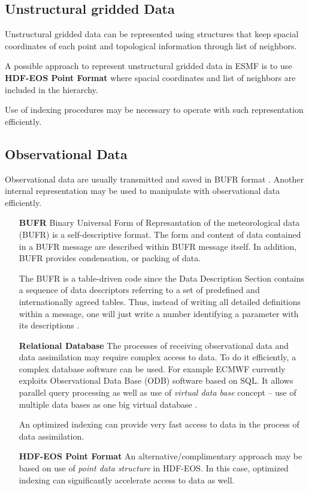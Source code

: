 \subsection{Unstructural gridded Data}

Unstructural gridded data can be represented using structures that
keep spacial coordinates of each point and topological information
through list of neighbors. 

A possible approach to represent unstructural gridded data in ESMF is
to use {\bf HDF-EOS Point Format} \cite{HDF-EOS} where spacial coordinates
and list of neighbors are included in the hierarchy.

Use of indexing procedures may be necessary to operate with such
representation efficiently. 

\subsection{Observational Data}

Observational data are usually transmitted and saved in BUFR format 
\cite{WMO-BUFR-CREX}. Another internal representation may be used to
manipulate with observational data efficiently.

\begin{itemize}
\item[\bf BUFR] Binary Universal Form of Represantation
of the meteorological data (BUFR) is a self-descriptive format. The
form and content of data contained in a BUFR message are described
within BUFR message itself. In addition, BUFR provides condensation,
or packing of data. 

The BUFR is a table-driven code since the Data Description Section
contains a sequence of data descriptors referring to a set of predefined and 
internationally agreed tables. Thus, instead of writing all detailed
definitions within a message, one will just write a number identifying
a parameter with its descriptions \cite{WMO-BUFR-CREX}.

\item[\bf Relational Database]
The processes of receiving observational data and data assimilation
may require complex access to data. To do it efficiently, a complex
database software can be used. For example ECMWF currently exploits
Observational Data Base (ODB) software based on SQL. It allows
parallel query processing as well as use of {\em virtual data base}
concept -- use of multiple data bases as one big virtual database
\cite{ODB}. 

An optimized indexing can provide very fast access to data in the
process of data assimilation.

\item[\bf HDF-EOS Point Format]
An alternative/complimentary approach may be based on use of {\em
point data structure} in HDF-EOS. In this case, optimized indexing can
significantly accelerate access to data as well.
\end{itemize}


